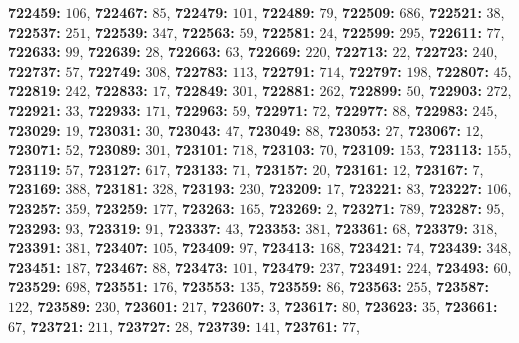 \textsf{\bfseries 722459:} $106$, \textsf{\bfseries 722467:} $85$, \textsf{\bfseries 722479:} $101$, \textsf{\bfseries 722489:} $79$, \textsf{\bfseries 722509:} $686$, \textsf{\bfseries 722521:} $38$, \textsf{\bfseries 722537:} $251$, \textsf{\bfseries 722539:} $347$, \textsf{\bfseries 722563:} $59$, \textsf{\bfseries 722581:} $24$, \textsf{\bfseries 722599:} $295$, \textsf{\bfseries 722611:} $77$, \textsf{\bfseries 722633:} $99$, \textsf{\bfseries 722639:} $28$, \textsf{\bfseries 722663:} $63$, \textsf{\bfseries 722669:} $220$, \textsf{\bfseries 722713:} $22$, \textsf{\bfseries 722723:} $240$, \textsf{\bfseries 722737:} $57$, \textsf{\bfseries 722749:} $308$, \textsf{\bfseries 722783:} $113$, \textsf{\bfseries 722791:} $714$, \textsf{\bfseries 722797:} $198$, \textsf{\bfseries 722807:} $45$, \textsf{\bfseries 722819:} $242$, \textsf{\bfseries 722833:} $17$, \textsf{\bfseries 722849:} $301$, \textsf{\bfseries 722881:} $262$, \textsf{\bfseries 722899:} $50$, \textsf{\bfseries 722903:} $272$, \textsf{\bfseries 722921:} $33$, \textsf{\bfseries 722933:} $171$, \textsf{\bfseries 722963:} $59$, \textsf{\bfseries 722971:} $72$, \textsf{\bfseries 722977:} $88$, \textsf{\bfseries 722983:} $245$, \textsf{\bfseries 723029:} $19$, \textsf{\bfseries 723031:} $30$, \textsf{\bfseries 723043:} $47$, \textsf{\bfseries 723049:} $88$, \textsf{\bfseries 723053:} $27$, \textsf{\bfseries 723067:} $12$, \textsf{\bfseries 723071:} $52$, \textsf{\bfseries 723089:} $301$, \textsf{\bfseries 723101:} $718$, \textsf{\bfseries 723103:} $70$, \textsf{\bfseries 723109:} $153$, \textsf{\bfseries 723113:} $155$, \textsf{\bfseries 723119:} $57$, \textsf{\bfseries 723127:} $617$, \textsf{\bfseries 723133:} $71$, \textsf{\bfseries 723157:} $20$, \textsf{\bfseries 723161:} $12$, \textsf{\bfseries 723167:} $7$, \textsf{\bfseries 723169:} $388$, \textsf{\bfseries 723181:} $328$, \textsf{\bfseries 723193:} $230$, \textsf{\bfseries 723209:} $17$, \textsf{\bfseries 723221:} $83$, \textsf{\bfseries 723227:} $106$, \textsf{\bfseries 723257:} $359$, \textsf{\bfseries 723259:} $177$, \textsf{\bfseries 723263:} $165$, \textsf{\bfseries 723269:} $2$, \textsf{\bfseries 723271:} $789$, \textsf{\bfseries 723287:} $95$, \textsf{\bfseries 723293:} $93$, \textsf{\bfseries 723319:} $91$, \textsf{\bfseries 723337:} $43$, \textsf{\bfseries 723353:} $381$, \textsf{\bfseries 723361:} $68$, \textsf{\bfseries 723379:} $318$, \textsf{\bfseries 723391:} $381$, \textsf{\bfseries 723407:} $105$, \textsf{\bfseries 723409:} $97$, \textsf{\bfseries 723413:} $168$, \textsf{\bfseries 723421:} $74$, \textsf{\bfseries 723439:} $348$, \textsf{\bfseries 723451:} $187$, \textsf{\bfseries 723467:} $88$, \textsf{\bfseries 723473:} $101$, \textsf{\bfseries 723479:} $237$, \textsf{\bfseries 723491:} $224$, \textsf{\bfseries 723493:} $60$, \textsf{\bfseries 723529:} $698$, \textsf{\bfseries 723551:} $176$, \textsf{\bfseries 723553:} $135$, \textsf{\bfseries 723559:} $86$, \textsf{\bfseries 723563:} $255$, \textsf{\bfseries 723587:} $122$, \textsf{\bfseries 723589:} $230$, \textsf{\bfseries 723601:} $217$, \textsf{\bfseries 723607:} $3$, \textsf{\bfseries 723617:} $80$, \textsf{\bfseries 723623:} $35$, \textsf{\bfseries 723661:} $67$, \textsf{\bfseries 723721:} $211$, \textsf{\bfseries 723727:} $28$, \textsf{\bfseries 723739:} $141$, \textsf{\bfseries 723761:} $77$, 
